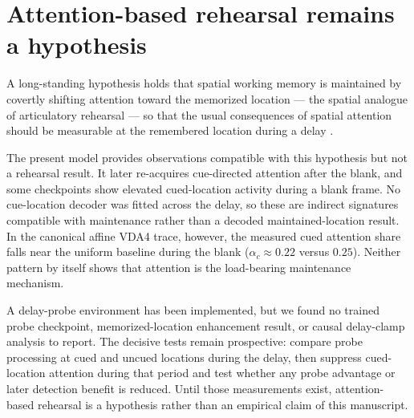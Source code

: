 \section{Attention-based rehearsal remains a hypothesis}
\label{sec:rehearsal}

A long-standing hypothesis holds that spatial working memory is maintained by
covertly shifting attention toward the memorized location --- the spatial analogue
of articulatory rehearsal --- so that the usual consequences of spatial attention
should be measurable at the remembered location during a delay
\cite{awh_jonides_reuterlorenz1998_rehearsal,awh_jonides2001_overlapping_attention_wm}.

The present model provides observations compatible with this hypothesis but not a
rehearsal result. It later re-acquires cue-directed attention after the blank, and
some checkpoints show elevated cued-location activity during a blank frame. No
cue-location decoder was fitted across the delay, so these are indirect signatures
compatible with maintenance rather than a decoded maintained-location result. In the
canonical affine VDA4 trace, however, the measured cued attention share falls near
the uniform baseline during the blank ($\alpha_c\approx0.22$ versus $0.25$). Neither
pattern by itself shows that attention is the load-bearing maintenance mechanism.

A delay-probe environment has been implemented, but we found no trained probe
checkpoint, memorized-location enhancement result, or causal delay-clamp analysis to
report. The decisive tests remain prospective: compare probe processing at cued and
uncued locations during the delay, then suppress cued-location attention during that
period and test whether any probe advantage or later detection benefit is reduced.
Until those measurements exist, attention-based rehearsal is a hypothesis rather
than an empirical claim of this manuscript.
